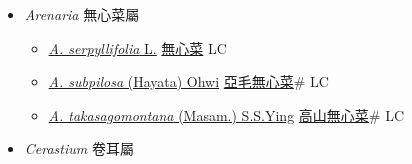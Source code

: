 
  \begin{itemize}
 \item[] \textit{Arenaria} 無心菜屬
                    
  \begin{itemize}
        \item[] \href{http://www.theplantlist.org/tpl1.1/search?q=Arenaria+serpyllifolia}{\textit{A. serpyllifolia} L.}   \href{\detokenize{http://taibnet.sinica.edu.tw/chi/taibnet_species_list.php?T2=無心菜&T2_new_value=true&fr=y}}{無心菜} LC
        \item[] \href{http://www.theplantlist.org/tpl1.1/search?q=Arenaria+subpilosa}{\textit{A. subpilosa} (Hayata) Ohwi}   \href{\detokenize{http://taibnet.sinica.edu.tw/chi/taibnet_species_list.php?T2=亞毛無心菜&T2_new_value=true&fr=y}}{亞毛無心菜}\# LC
        \item[] \href{http://www.theplantlist.org/tpl1.1/search?q=Arenaria+takasagomontana}{\textit{A. takasagomontana} (Masam.) S.S.Ying}   \href{\detokenize{http://taibnet.sinica.edu.tw/chi/taibnet_species_list.php?T2=高山無心菜&T2_new_value=true&fr=y}}{高山無心菜}\# LC
  \end{itemize}
 \item[] \textit{Cerastium} 卷耳屬
                    

\end{itemize}
